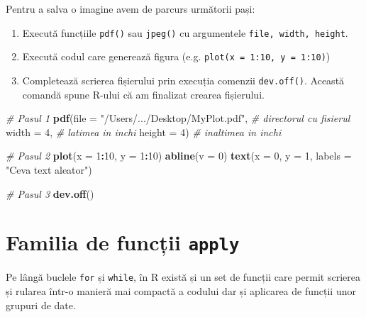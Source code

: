 \documentclass[]{article}
\newenvironment{Shaded}{\begin{snugshade}}{\end{snugshade}}
\newcommand{\KeywordTok}[1]{\textcolor[rgb]{0.13,0.29,0.53}{\textbf{#1}}}
\newcommand{\DataTypeTok}[1]{\textcolor[rgb]{0.13,0.29,0.53}{#1}}
\newcommand{\DecValTok}[1]{\textcolor[rgb]{0.00,0.00,0.81}{#1}}
\newcommand{\StringTok}[1]{\textcolor[rgb]{0.31,0.60,0.02}{#1}}
\newcommand{\CommentTok}[1]{\textcolor[rgb]{0.56,0.35,0.01}{\textit{#1}}}
\newcommand{\OperatorTok}[1]{\textcolor[rgb]{0.81,0.36,0.00}{\textbf{#1}}}
\newcommand{\NormalTok}[1]{#1}
\providecommand{\tightlist}{%
  \setlength{\itemsep}{0pt}\setlength{\parskip}{0pt}}
\begin{document}
Pentru a salva o imagine avem de parcurs următorii pași:

\begin{enumerate}
\def\labelenumi{\arabic{enumi}.}
\tightlist
\item
  Execută funcțiile \texttt{pdf()} sau \texttt{jpeg()} cu argumentele
  \texttt{file,\ width,\ height}.
\item
  Execută codul care generează figura (e.g.
  \texttt{plot(x\ =\ 1:10,\ y\ =\ 1:10)})
\item
  Completează scrierea fișierului prin execuția comenzii
  \texttt{dev.off()}. Această comandă spune R-ului că am finalizat
  crearea fișierului.
\end{enumerate}

\begin{Shaded}
\begin{Highlighting}[]
\CommentTok{# Pasul 1}
\KeywordTok{pdf}\NormalTok{(}\DataTypeTok{file =} \StringTok{"/Users/.../Desktop/MyPlot.pdf"}\NormalTok{,   }\CommentTok{# directorul cu fisierul }
    \DataTypeTok{width =} \DecValTok{4}\NormalTok{, }\CommentTok{# latimea in inchi}
    \DataTypeTok{height =} \DecValTok{4}\NormalTok{) }\CommentTok{# inaltimea in inchi}

\CommentTok{# Pasul 2}
\KeywordTok{plot}\NormalTok{(}\DataTypeTok{x =} \DecValTok{1}\OperatorTok{:}\DecValTok{10}\NormalTok{, }
     \DataTypeTok{y =} \DecValTok{1}\OperatorTok{:}\DecValTok{10}\NormalTok{)}
\KeywordTok{abline}\NormalTok{(}\DataTypeTok{v =} \DecValTok{0}\NormalTok{) }
\KeywordTok{text}\NormalTok{(}\DataTypeTok{x =} \DecValTok{0}\NormalTok{, }\DataTypeTok{y =} \DecValTok{1}\NormalTok{, }\DataTypeTok{labels =} \StringTok{"Ceva text aleator"}\NormalTok{)}

\CommentTok{# Pasul 3}
\KeywordTok{dev.off}\NormalTok{()}
\end{Highlighting}
\end{Shaded}

\section{\texorpdfstring{Familia de funcții
\texttt{apply}}{Familia de funcții apply}}\label{familia-de-functii-apply}

Pe lângă buclele \texttt{for} și \texttt{while}, în R există și un set
de funcții care permit scrierea și rularea într-o manieră mai compactă a
codului dar și aplicarea de funcții unor grupuri de date.
\end{document}
